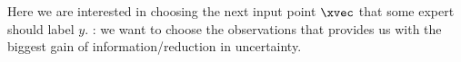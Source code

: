 \begin{sectionbox}\nospacing
  Here we are interested in choosing the next input point $\xvec$
  that some expert should label $y$.
  : we want to choose the observations that provides us with the biggest gain of information/reduction in uncertainty.
\end{sectionbox}
